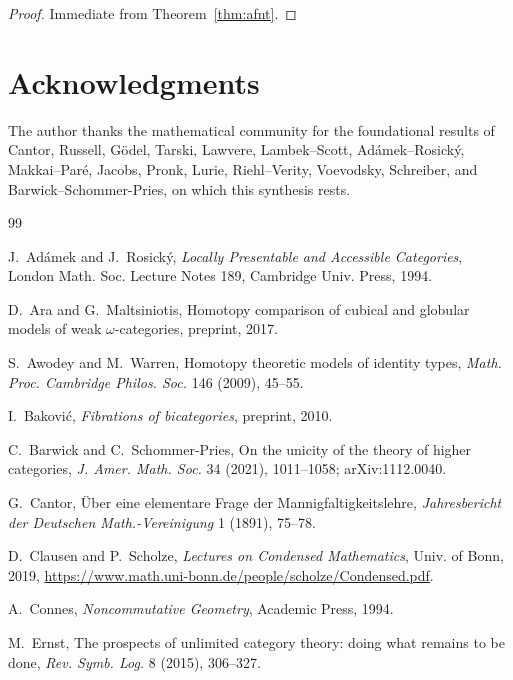\documentclass[11pt]{article}
\theoremstyle{plain}
\theoremstyle{definition}
\begin{document}
\begin{proof}
Immediate from Theorem~\ref{thm:afnt}.
\end{proof}

\section*{Acknowledgments}

The author thanks the mathematical community for the foundational results of Cantor, Russell, G\"odel, Tarski, Lawvere, Lambek--Scott, Ad\'amek--Rosick\'y, Makkai--Par\'e, Jacobs, Pronk, Lurie, Riehl--Verity, Voevodsky, Schreiber, and Barwick--Schommer-Pries, on which this synthesis rests.

\begin{thebibliography}{99}

J.~Ad\'amek and J.~Rosick\'y,
\newblock \emph{Locally Presentable and Accessible Categories},
\newblock London Math. Soc. Lecture Notes 189, Cambridge Univ. Press, 1994.

D.~Ara and G.~Maltsiniotis,
\newblock Homotopy comparison of cubical and globular models of weak $\omega$-categories,
\newblock preprint, 2017.

S.~Awodey and M.~Warren,
\newblock Homotopy theoretic models of identity types,
\newblock \emph{Math. Proc. Cambridge Philos. Soc.} 146 (2009), 45--55.

I.~Bakovi\'c,
\newblock \emph{Fibrations of bicategories},
\newblock preprint, 2010.

C.~Barwick and C.~Schommer-Pries,
\newblock On the unicity of the theory of higher categories,
\newblock \emph{J. Amer. Math. Soc.} 34 (2021), 1011--1058; arXiv:1112.0040.

G.~Cantor,
\newblock \"Uber eine elementare Frage der Mannigfaltigkeitslehre,
\newblock \emph{Jahresbericht der Deutschen Math.-Vereinigung} 1 (1891), 75--78.

D.~Clausen and P.~Scholze,
\newblock \emph{Lectures on Condensed Mathematics},
\newblock Univ. of Bonn, 2019,
\newblock \url{https://www.math.uni-bonn.de/people/scholze/Condensed.pdf}.

A.~Connes,
\newblock \emph{Noncommutative Geometry},
\newblock Academic Press, 1994.

M.~Ernst,
\newblock The prospects of unlimited category theory: doing what remains to be done,
\newblock \emph{Rev. Symb. Log.} 8 (2015), 306--327.


\end{thebibliography}
\end{document}
